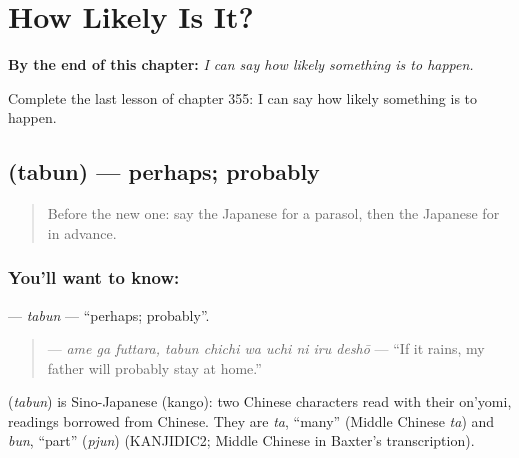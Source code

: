 
\chapter{How Likely Is It?}
\label{ch:ja-how-likely-is-it}

\begin{chapteropening}
\textbf{By the end of this chapter:} \emph{I can say how likely something is to happen.}

Complete the last lesson of chapter 355: I can say how likely something is to happen.
\end{chapteropening}

\section[\texorpdfstring{\ja{たぶん} (tabun)}{たぶん (tabun)}]{ (tabun) — perhaps; probably}

\label{lesson:JA-C355-tabun}



\begin{quote}
Before the new one: say the Japanese for a parasol, then the Japanese for in advance.
\end{quote}

\subsection*{You'll want to know: }
\textbf{} — \emph{tabun} — \textquotedblleft{}perhaps; probably\textquotedblright{}.

\begin{quote}
\textbf{    } — \emph{ame ga futtara, tabun chichi wa uchi ni iru deshō} — \textquotedblleft{}If it rains, my father will probably stay at home.\textquotedblright{}
\end{quote}

\begin{cousinweb}
\textbf{} (\emph{tabun}) is Sino-Japanese (kango): two Chinese characters read with their on'yomi, readings borrowed from Chinese. They are \emph{ta}, \textquotedblleft{}many\textquotedblright{} (Middle Chinese \emph{ta}) and \emph{bun}, \textquotedblleft{}part\textquotedblright{} (\emph{pjun}) (KANJIDIC2; Middle Chinese in Baxter's transcription).
\end{cousinweb}

